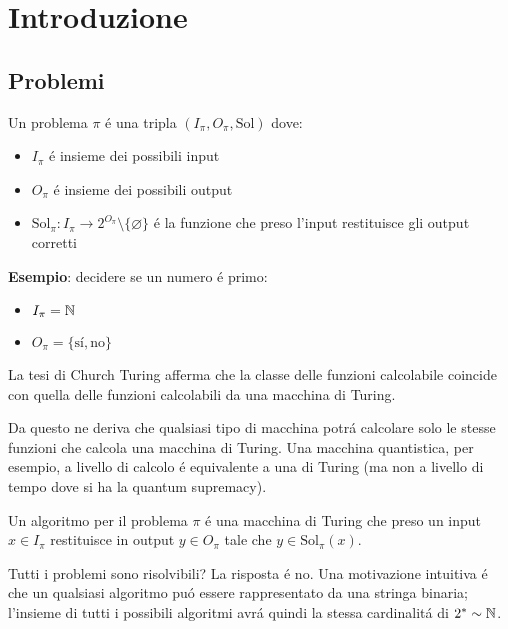 \section{Introduzione}
\subsection{Problemi}
\begin{definizione}[Problema]
    Un problema $\pi$ é una tripla $(I_{\pi},O_{\pi},\text{Sol})$ dove:
    \begin{itemize}
        \item $I_{\pi}$ é insieme dei possibili input
        \item $O_{\pi}$ é insieme dei possibili output
        \item $\text{Sol}_{\pi}:I_{\pi}\rightarrow 2^{O_{\pi}} \setminus \{\varnothing \}$ é la funzione che preso l'input restituisce gli output corretti 
    \end{itemize}
\end{definizione}

\noindent
\textbf{Esempio}: decidere se un numero é primo:
\begin{itemize}
    \item $I_{\pi} = \mathbb{N}$
    \item $O_{\pi} = \{\text{sí},\text{no}\}$
\end{itemize}

\begin{lemma}
    La tesi di Church Turing afferma che la classe delle funzioni calcolabile coincide con quella delle funzioni calcolabili da una macchina di Turing. 
\end{lemma}

Da questo ne deriva che qualsiasi tipo di macchina potrá calcolare solo le stesse funzioni che calcola una macchina di Turing. Una macchina quantistica, per esempio, a livello di calcolo é equivalente a una di Turing (ma non a livello di tempo dove si ha la quantum supremacy).

\begin{definizione}[Algoritmo]
    Un algoritmo per il problema $\pi$ é una macchina di Turing che preso un input $x\in I_{\pi}$ restituisce in output $y\in O_{\pi}$ tale che $y\in\text{Sol}_{\pi}(x)$.
\end{definizione}

Tutti i problemi sono risolvibili? La risposta é no. Una motivazione intuitiva é che un qualsiasi algoritmo puó essere rappresentato da una stringa binaria; l'insieme di tutti i possibili algoritmi avrá quindi la stessa cardinalitá di $2^* \sim \mathbb{N}$.

